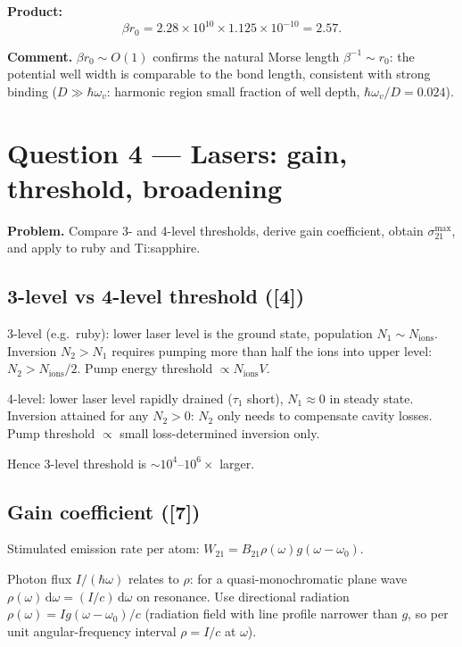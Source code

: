 \documentclass[11pt]{article}
\newcommand{\de}{\mathrm{d}}
\begin{document}
\textbf{Product:}
\[
\beta r_0 = 2.28\times 10^{10}\times 1.125\times 10^{-10} = \boxed{2.57}.
\]

\textbf{Comment.} $\beta r_0 \sim O(1)$ confirms the natural Morse length
$\beta^{-1}\sim r_0$: the potential well width is comparable to the bond length,
consistent with strong binding ($D\gg\hbar\omega_v$: harmonic region small fraction
of well depth, $\hbar\omega_v/D = 0.024$).

\section*{Question 4 --- Lasers: gain, threshold, broadening}

\textbf{Problem.} Compare 3- and 4-level thresholds, derive gain coefficient,
obtain $\sigma_{21}^{\max}$, and apply to ruby and Ti:sapphire.

\subsection*{3-level vs 4-level threshold ([4])}

3-level (e.g.\ ruby): lower laser level is the ground state, population $N_1\sim N_{\text{ions}}$. Inversion $N_2 > N_1$ requires pumping more than half the ions into upper level: $N_2 > N_{\text{ions}}/2$. Pump energy threshold $\propto N_{\text{ions}}V$.

4-level: lower laser level rapidly drained ($\tau_1$ short), $N_1\approx 0$ in steady
state. Inversion attained for any $N_2 > 0$: $N_2$ only needs to compensate cavity
losses. Pump threshold $\propto$ small loss-determined inversion only.

Hence 3-level threshold is $\sim\!10^4$--$10^6\times$ larger.

\subsection*{Gain coefficient ([7])}

Stimulated emission rate per atom: $W_{21} = B_{21}\rho(\omega)g(\omega-\omega_0)$.

Photon flux $I/(\hbar\omega)$ relates to $\rho$: for a quasi-monochromatic plane wave $\rho(\omega)\,\de\omega = (I/c)\,\de\omega$ on resonance. Use directional radiation $\rho(\omega) = I g(\omega-\omega_0)/c$ (radiation field with line profile narrower than $g$, so per unit angular-frequency interval $\rho = I/c$ at $\omega$).
\end{document}
